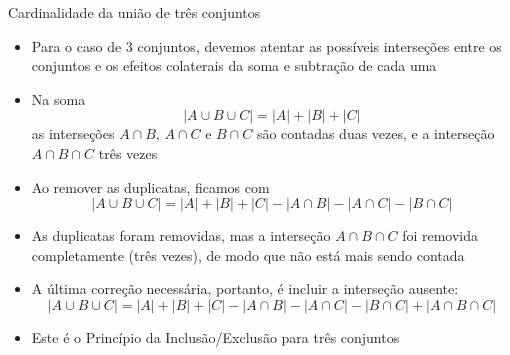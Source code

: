 \begin{frame}[fragile]{Cardinalidade da união de três conjuntos}

    \begin{itemize}
        \item Para o caso de 3 conjuntos, devemos atentar as possíveis interseções entre os conjuntos e os efeitos colaterais da soma e subtração de cada uma

        \item Na soma
        \[
            | A \cup B \cup C | = | A | + | B | + | C |
        \]
        as interseções $A\cap B$, $A\cap C$ e $B\cap C$ são contadas duas vezes, e a interseção $A\cap B\cap C$ três vezes

        \item Ao remover as duplicatas, ficamos com
        \[
            | A \cup B \cup C | = | A | + | B | + | C | - | A \cap B | - | A \cap C | - | B \cap C |
        \]

        \item As duplicatas foram removidas, mas a interseção $A\cap B\cap C$ foi removida completamente (três vezes), de modo que não está mais sendo contada

        \item A última correção necessária, portanto, é incluir a interseção ausente:
        \[
            | A \cup B \cup C | = | A | + | B | + | C | - | A \cap B | - | A \cap C | - | B \cap C | + | A \cap B \cap C |
        \]

        \item Este é o Princípio da Inclusão/Exclusão para três conjuntos

    \end{itemize}

\end{frame}

